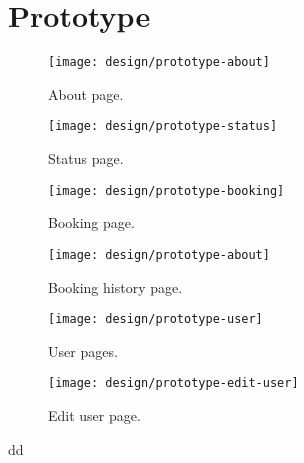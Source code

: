 \section{Prototype}

\begin{figure}[h]
	\centering
	\texttt{[image: design/prototype-about]}
	\caption{About page.}\label{fig:prototype-about}
\end{figure}

\begin{figure}[h]
	\centering
	\texttt{[image: design/prototype-status]}
	\caption{Status page.}\label{fig:prototype-status}
\end{figure}

\begin{figure}[h]
	\centering
	\texttt{[image: design/prototype-booking]}
	\caption{Booking page.}\label{fig:prototype-book}
\end{figure}

\begin{figure}[h]
	\centering
	\texttt{[image: design/prototype-about]}
	\caption{Booking history page.}\label{fig:prototype-book-history}
\end{figure}

\begin{figure}[h]
	\centering
	\texttt{[image: design/prototype-user]}
	\caption{User pages.}\label{fig:prototype-user-overall}
\end{figure}

\begin{figure}[h]
	\centering
	\texttt{[image: design/prototype-edit-user]}
	\caption{Edit user page.}\label{fig:prototype-edit-user}
\end{figure}

dd